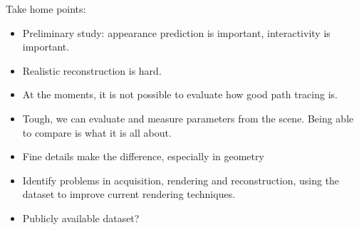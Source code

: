 Take home points:
\begin{itemize}
\item Preliminary study: appearance prediction is important, interactivity is important.
\item Realistic reconstruction is hard. 
\item At the moments, it is not possible to evaluate how good path tracing is.
\item Tough, we can evaluate and measure parameters from the scene. Being able to compare is what it is all about.
\item Fine details make the difference, especially in geometry
\item Identify problems in acquisition, rendering and reconstruction, using the dataset to improve current rendering techniques.
\item Publicly available dataset?

\end{itemize}

